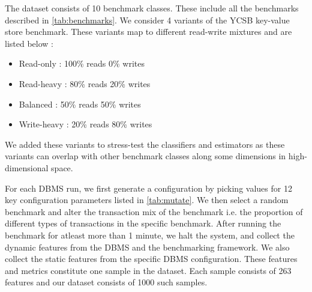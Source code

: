 The dataset consists of 10 benchmark classes. These include all the benchmarks
described in \cref{tab:benchmarks}. We consider 4 variants of the YCSB key-value
store benchmark. These variants map to different read-write mixtures and are
listed below :\\

\begin{itemize}
  \item {Read-only : 100\% reads 0\% writes }
  \item {Read-heavy : 80\% reads 20\% writes }
  \item {Balanced : 50\% reads 50\% writes }
  \item {Write-heavy : 20\% reads 80\% writes } \\
\end{itemize}

We added these variants to stress-test the classifiers and estimators as these
variants can overlap with other benchmark classes along some dimensions in
high-dimensional space.

For each DBMS run, we first generate a configuration by picking
values for 12 key configuration parameters listed in \cref{tab:mutate}.
We then select a random benchmark and alter the transaction mix of the
benchmark i.e. the proportion of different types of transactions in
the specific benchmark. After running the benchmark for atleast more than
1 minute, we halt the system, and collect the dynamic features from the
DBMS and the benchmarking framework. We also collect the static features
from the specific DBMS configuration. These features and metrics constitute
one sample in the dataset.
Each sample consists of 263 features and our dataset consists of 1000
such samples.
